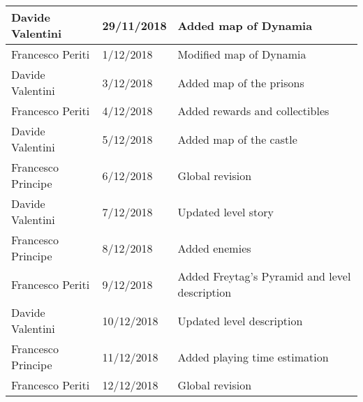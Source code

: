 \begin{table}[H]
\begin{tabular}{|l|l|l|}
Davide Valentini & 29/11/2018 & Added map of Dynamia \\ \hline
Francesco Periti & 1/12/2018 & Modified map of Dynamia \\ \hline
Davide Valentini & 3/12/2018 & Added map of the prisons \\ \hline
Francesco Periti & 4/12/2018 & Added rewards and collectibles \\ \hline
Davide Valentini & 5/12/2018 & Added map of the castle \\ \hline
Francesco Principe & 6/12/2018 & Global revision \\ \hline
Davide Valentini & 7/12/2018 & Updated level story \\ \hline
Francesco Principe & 8/12/2018 & Added enemies \\ \hline
Francesco Periti & 9/12/2018 & Added Freytag's Pyramid and level description \\ \hline
Davide Valentini & 10/12/2018 & Updated level description \\ \hline
Francesco Principe & 11/12/2018 & Added playing time estimation \\ \hline
Francesco Periti & 12/12/2018 & Global revision \\ \hline
\end{tabular}
\end{table}
